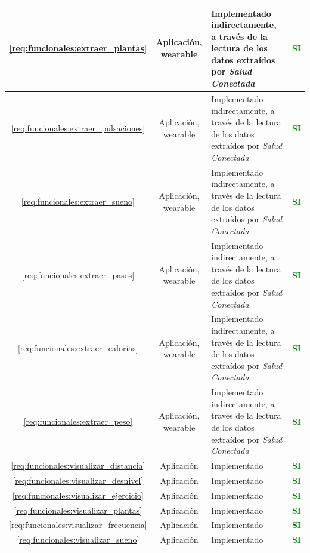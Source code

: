 \begin{xltabular}{\textwidth}{|c|c|X|c|}
        \hline
        \ref{req:funcionales:extraer_plantas} & Aplicación, \gls{wearable} & Implementado indirectamente, a través de la lectura de los datos extraídos por \textit{Salud Conectada} & \textcolor{green}{\textbf{SI}} \\
        \hline
        \ref{req:funcionales:extraer_pulsaciones} & Aplicación, \gls{wearable} & Implementado indirectamente, a través de la lectura de los datos extraídos por \textit{Salud Conectada} & \textcolor{green}{\textbf{SI}} \\
        \hline
        \ref{req:funcionales:extraer_sueno} & Aplicación, \gls{wearable} & Implementado indirectamente, a través de la lectura de los datos extraídos por \textit{Salud Conectada} & \textcolor{green}{\textbf{SI}} \\
        \hline
        \ref{req:funcionales:extraer_pasos} & Aplicación, \gls{wearable} & Implementado indirectamente, a través de la lectura de los datos extraídos por \textit{Salud Conectada} & \textcolor{green}{\textbf{SI}} \\
        \hline
        \ref{req:funcionales:extraer_calorias} & Aplicación, \gls{wearable} & Implementado indirectamente, a través de la lectura de los datos extraídos por \textit{Salud Conectada} & \textcolor{green}{\textbf{SI}} \\
        \hline
        \ref{req:funcionales:extraer_peso} & Aplicación, \gls{wearable} & Implementado indirectamente, a través de la lectura de los datos extraídos por \textit{Salud Conectada} & \textcolor{green}{\textbf{SI}} \\
        \hline
        \ref{req:funcionales:visualizar_distancia} & Aplicación & Implementado & \textcolor{green}{\textbf{SI}} \\
        \hline
        \ref{req:funcionales:visualizar_desnivel} & Aplicación & Implementado & \textcolor{green}{\textbf{SI}} \\
        \hline
        \ref{req:funcionales:visualizar_ejercicio} & Aplicación & Implementado & \textcolor{green}{\textbf{SI}} \\
        \hline
        \ref{req:funcionales:visualizar_plantas} & Aplicación & Implementado & \textcolor{green}{\textbf{SI}} \\
        \hline
        \ref{req:funcionales:visualizar_frecuencia} & Aplicación & Implementado & \textcolor{green}{\textbf{SI}} \\
        \hline
        \ref{req:funcionales:visualizar_sueno} & Aplicación & Implementado & \textcolor{green}{\textbf{SI}} \\

\end{xltabular}
